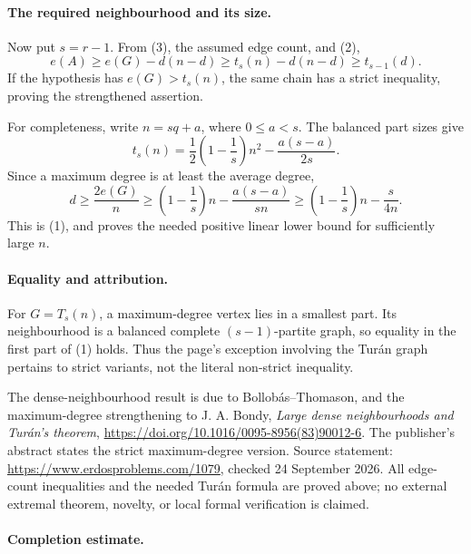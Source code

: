 \paragraph{The required neighbourhood and its size.}
Now put \(s=r-1\). From (3), the assumed edge count, and (2),
\[
 e(A)\geq e(G)-d(n-d)
 \geq t_s(n)-d(n-d)
 \geq t_{s-1}(d).
\]
If the hypothesis has \(e(G)>t_s(n)\), the same chain has a strict inequality, proving the strengthened assertion.

For completeness, write \(n=sq+a\), where \(0\leq a<s\). The balanced part sizes give
\[
 t_s(n)=\frac12\left(1-\frac1s\right)n^2
             -\frac{a(s-a)}{2s}.
\]
Since a maximum degree is at least the average degree,
\[
 d\geq\frac{2e(G)}n\geq
 \left(1-\frac1s\right)n-\frac{a(s-a)}{sn}
 \geq\left(1-\frac1s\right)n-\frac{s}{4n}.
\]
This is (1), and proves the needed positive linear lower bound for sufficiently large \(n\).

\paragraph{Equality and attribution.}
For \(G=T_s(n)\), a maximum-degree vertex lies in a smallest part. Its neighbourhood is a balanced complete \((s-1)\)-partite graph, so equality in the first part of (1) holds. Thus the page's exception involving the Tur\'an graph pertains to strict variants, not the literal non-strict inequality.

The dense-neighbourhood result is due to Bollob\'as--Thomason, and the maximum-degree strengthening to J. A. Bondy, \emph{Large dense neighbourhoods and Tur\'an's theorem}, \url{https://doi.org/10.1016/0095-8956(83)90012-6}. The publisher's abstract states the strict maximum-degree version. Source statement: \url{https://www.erdosproblems.com/1079}, checked 24 September 2026. All edge-count inequalities and the needed Tur\'an formula are proved above; no external extremal theorem, novelty, or local formal verification is claimed.

\paragraph{Completion estimate.}
